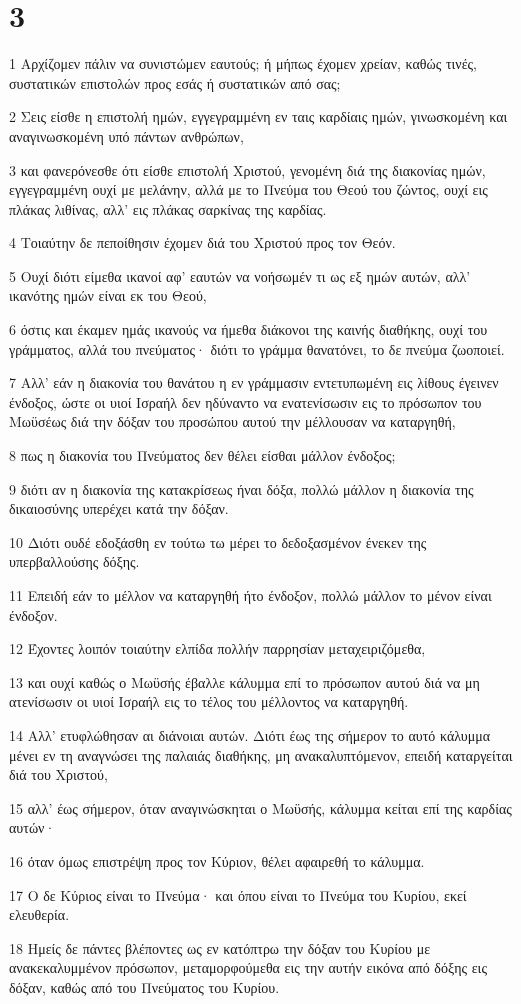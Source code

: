 \chapter{3}

\par 1 Αρχίζομεν πάλιν να συνιστώμεν εαυτούς; ή μήπως έχομεν χρείαν, καθώς τινές, συστατικών επιστολών προς εσάς ή συστατικών από σας;
\par 2 Σεις είσθε η επιστολή ημών, εγγεγραμμένη εν ταις καρδίαις ημών, γινωσκομένη και αναγινωσκομένη υπό πάντων ανθρώπων,
\par 3 και φανερόνεσθε ότι είσθε επιστολή Χριστού, γενομένη διά της διακονίας ημών, εγγεγραμμένη ουχί με μελάνην, αλλά με το Πνεύμα του Θεού του ζώντος, ουχί εις πλάκας λιθίνας, αλλ' εις πλάκας σαρκίνας της καρδίας.
\par 4 Τοιαύτην δε πεποίθησιν έχομεν διά του Χριστού προς τον Θεόν.
\par 5 Ουχί διότι είμεθα ικανοί αφ' εαυτών να νοήσωμέν τι ως εξ ημών αυτών, αλλ' ικανότης ημών είναι εκ του Θεού,
\par 6 όστις και έκαμεν ημάς ικανούς να ήμεθα διάκονοι της καινής διαθήκης, ουχί του γράμματος, αλλά του πνεύματος· διότι το γράμμα θανατόνει, το δε πνεύμα ζωοποιεί.
\par 7 Αλλ' εάν η διακονία του θανάτου η εν γράμμασιν εντετυπωμένη εις λίθους έγεινεν ένδοξος, ώστε οι υιοί Ισραήλ δεν ηδύναντο να ενατενίσωσιν εις το πρόσωπον του Μωϋσέως διά την δόξαν του προσώπου αυτού την μέλλουσαν να καταργηθή,
\par 8 πως η διακονία του Πνεύματος δεν θέλει είσθαι μάλλον ένδοξος;
\par 9 διότι αν η διακονία της κατακρίσεως ήναι δόξα, πολλώ μάλλον η διακονία της δικαιοσύνης υπερέχει κατά την δόξαν.
\par 10 Διότι ουδέ εδοξάσθη εν τούτω τω μέρει το δεδοξασμένον ένεκεν της υπερβαλλούσης δόξης.
\par 11 Επειδή εάν το μέλλον να καταργηθή ήτο ένδοξον, πολλώ μάλλον το μένον είναι ένδοξον.
\par 12 Έχοντες λοιπόν τοιαύτην ελπίδα πολλήν παρρησίαν μεταχειριζόμεθα,
\par 13 και ουχί καθώς ο Μωϋσής έβαλλε κάλυμμα επί το πρόσωπον αυτού διά να μη ατενίσωσιν οι υιοί Ισραήλ εις το τέλος του μέλλοντος να καταργηθή.
\par 14 Αλλ' ετυφλώθησαν αι διάνοιαι αυτών. Διότι έως της σήμερον το αυτό κάλυμμα μένει εν τη αναγνώσει της παλαιάς διαθήκης, μη ανακαλυπτόμενον, επειδή καταργείται διά του Χριστού,
\par 15 αλλ' έως σήμερον, όταν αναγινώσκηται ο Μωϋσής, κάλυμμα κείται επί της καρδίας αυτών·
\par 16 όταν όμως επιστρέψη προς τον Κύριον, θέλει αφαιρεθή το κάλυμμα.
\par 17 Ο δε Κύριος είναι το Πνεύμα· και όπου είναι το Πνεύμα του Κυρίου, εκεί ελευθερία.
\par 18 Ημείς δε πάντες βλέποντες ως εν κατόπτρω την δόξαν του Κυρίου με ανακεκαλυμμένον πρόσωπον, μεταμορφούμεθα εις την αυτήν εικόνα από δόξης εις δόξαν, καθώς από του Πνεύματος του Κυρίου.

